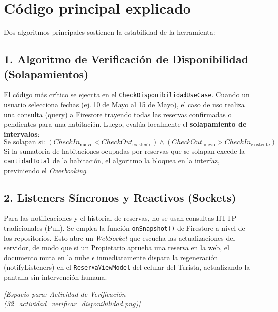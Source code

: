 \documentclass{article}
\begin{document}
\section{Código principal explicado}
Dos algoritmos principales sostienen la estabilidad de la herramienta:

\subsection{1. Algoritmo de Verificación de Disponibilidad (Solapamientos)}
El código más crítico se ejecuta en el \texttt{CheckDisponibilidadUseCase}. Cuando un usuario selecciona fechas (ej. 10 de Mayo al 15 de Mayo), el caso de uso realiza una consulta (query) a Firestore trayendo todas las reservas confirmadas o pendientes para una habitación. 
Luego, evalúa localmente el \textbf{solapamiento de intervalos}:
$$ \text{Se solapan si: } (CheckIn_{\text{nuevo}} < CheckOut_{\text{existente}}) \land (CheckOut_{\text{nuevo}} > CheckIn_{\text{existente}}) $$
Si la sumatoria de habitaciones ocupadas por reservas que se solapan excede la \texttt{cantidadTotal} de la habitación, el algoritmo la bloquea en la interfaz, previniendo el \textit{Overbooking}.

\subsection{2. Listeners Síncronos y Reactivos (Sockets)}
Para las notificaciones y el historial de reservas, no se usan consultas HTTP tradicionales (Pull). Se emplea la función \texttt{onSnapshot()} de Firestore a nivel de los repositorios. Esto abre un \textit{WebSocket} que escucha las actualizaciones del servidor, de modo que si un Propietario aprueba una reserva en la web, el documento muta en la nube e inmediatamente dispara la regeneración (notifyListeners) en el \texttt{ReservaViewModel} del celular del Turista, actualizando la pantalla sin intervención humana.

\vspace{0.5cm}
\begin{center}
    \textit{[Espacio para: Actividad de Verificación (32\_actividad\_verificar\_disponibilidad.png)]}
\end{center}
\end{document}
